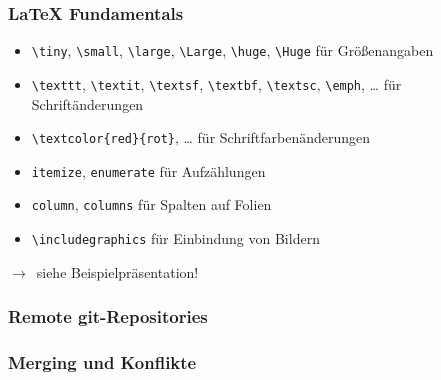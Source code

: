 \documentclass{cms-kurs}
\begin{document}
\begin{frame}[fragile]
  \frametitle{\LaTeX{} Fundamentals}

  \onslide<+->

  \begin{itemize}
  \item \lstinline{\tiny}, \lstinline{\small}, \lstinline{\large},
    \lstinline{\Large}, \lstinline{\huge}, \lstinline{\Huge} für Größenangaben
  \item \lstinline{\texttt}, \lstinline{\textit}, \lstinline{\textsf},
    \lstinline{\textbf}, \lstinline{\textsc}, \lstinline{\emph}, … für
    Schriftänderungen
  \item \lstinline=\textcolor{red}{rot}=, … für Schriftfarbenänderungen
  \item \lstinline{itemize}, \lstinline{enumerate} für Aufzählungen
  \item \lstinline{column}, \lstinline{columns} für Spalten auf Folien
  \item \lstinline{\includegraphics} für Einbindung von Bildern
  \end{itemize}

  \onslide<+->

  \medskip{}

  $\to$~siehe Beispielpräsentation!

\end{frame}

\begin{frame}
  \frametitle{Remote git-Repositories}

  \onslide<+->


\end{frame}

\begin{frame}
  \frametitle{Merging und Konflikte}


\end{frame}
\end{document}
